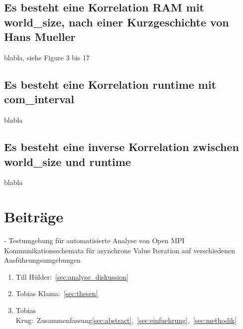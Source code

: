 \subsection{Es besteht eine Korrelation RAM mit world\_size, nach einer Kurzgeschichte von Hans Mueller}
blabla, siehe Figure 3 bis 17

\subsection{Es besteht eine Korrelation runtime mit com\_interval}
blabla

\subsection{Es besteht eine inverse Korrelation zwischen world\_size und runtime}
blabla

\section{Beiträge}
\label{sec:beitraege}
- Testumgebung für automatisierte Analyse von Open MPI Kommunikationsschemata für asynchrone Value Iteration auf verschiedenen Ausführungsumgebungen

\begin{enumerate}
    \item Till Hülder:~\ref{sec:analyse_diskussion}
    \item Tobias Klama:~\ref{sec:thesen}
    \item Tobias Krug:~Zusammenfassung\ref{sec:abstract},~\ref{sec:einfuehrung},~\ref{sec:methodik}
\end{enumerate}

